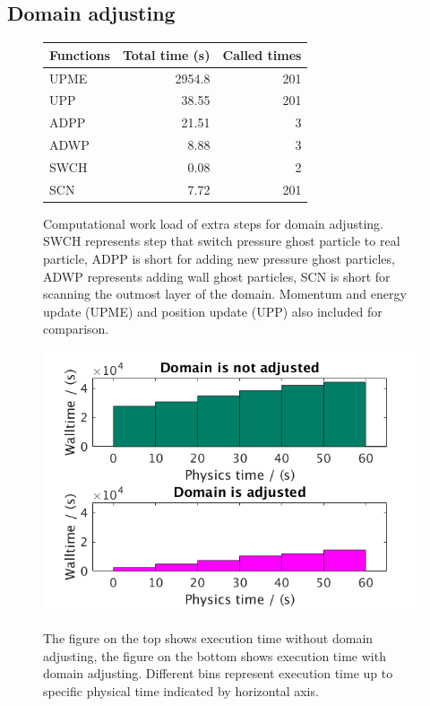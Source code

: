 \documentclass[procedia]{easychair}
\begin{document}
\subsection{Domain adjusting}
\begin{figure}
\CenterFloatBoxes
\begin{floatrow}
\ttabbox
{	  
    \begin{tabular}{lrr}
    \hline
    Functions & Total time (s) & Called times\\
    	\hline
    UPME & 2954.8 & 201 \\
    UPP & 38.55 &  201 \\
    ADPP & 21.51 & 3 \\
    ADWP  & 8.88 & 3 \\
    SWCH & 0.08 &  2 \\
    SCN  & 7.72 & 201 \\
    \hline
  \end{tabular}
}
{\caption{Computational work load of extra steps for domain adjusting. SWCH represents step that switch pressure ghost particle to real particle, ADPP is short for adding new pressure ghost particles, ADWP represents adding wall ghost particles, SCN is short for scanning the outmost layer of the domain.  Momentum and energy update (UPME) and position update (UPP) also included for comparison.}
\label{tab:Computational_cost_doamin_adj}}
\killfloatstyle
\ffigbox
{\includegraphics[scale=0.35]{adj_vs_no}}
{\caption{The figure on the top shows execution time without domain adjusting, the figure on the bottom shows execution time with domain adjusting. Different bins represent execution time up to specific physical time indicated by horizontal axis.}
\label{fig:adj_vs_no}}
\end{floatrow}
\end{figure}
\end{document}
